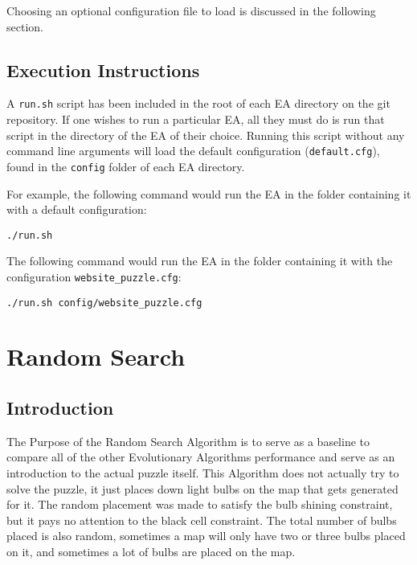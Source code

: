 \documentclass[11pt]{article}
\begin{document}
Choosing an optional configuration file to load is discussed in the following section.


\subsection{Execution Instructions}

A \texttt{run.sh} script has been included in the root of each EA
directory on the git repository. If one wishes to run a particular
EA, all they must do is run that script in the directory of the EA
of their choice. Running this script without any command line arguments
will load the default configuration (\texttt{default.cfg}), found in the \texttt{config} folder
of each EA directory.

For example, the following command would run the EA in the folder
containing it with a default configuration:

\vspace{5mm}

{\centering \texttt{./run.sh}\par }

\vspace{5mm}

The following command would run the EA in the folder
containing it with the configuration \texttt{website\_puzzle.cfg}:

\vspace{5mm}

{\centering \texttt{./run.sh config/website\_puzzle.cfg}\par }

\vspace{5mm}


\section{Random Search}

\subsection{Introduction}
The Purpose of the Random Search Algorithm is to serve as a baseline
to compare all of the other Evolutionary Algorithms performance and serve 
as an introduction to the actual puzzle itself. This Algorithm does not 
actually try to solve the puzzle, it just places down light bulbs on the
map that gets generated for it. The random placement was made to satisfy the  
bulb shining constraint, but it pays no attention to the black cell constraint.
The total number of bulbs placed is also random, sometimes a map will only have two
or three bulbs placed on it, and sometimes a lot of bulbs are placed on the map.
\end{document}
